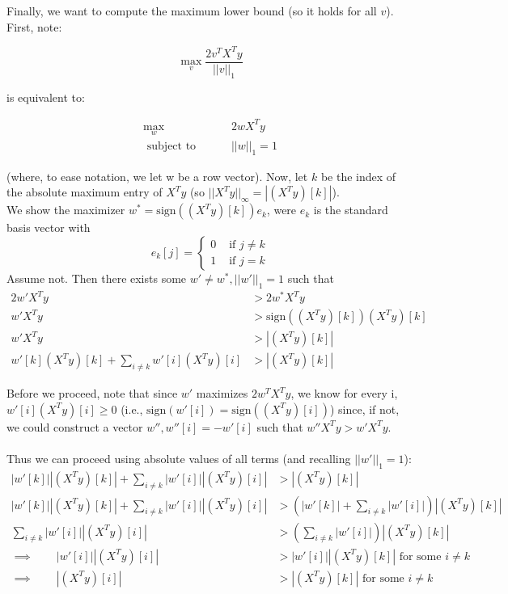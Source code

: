 \documentclass[paper=a4, fontsize=11pt]{scrartcl} %
\numberwithin{equation}{section} %
\numberwithin{figure}{section} %
\numberwithin{table}{section} %
\begin{document}
Finally, we want to compute the maximum lower bound (so it holds for all $v$). First, note:

\[\max_v \frac{2v^TX^Ty}{||v||_1}\]

is equivalent to:

\begin{align*}
\max_w \qquad{}& 2wX^Ty \\
\textrm{ subject to } \qquad{}&||w||_1 = 1
 \end{align*}

(where, to ease notation, we let w be a row vector). Now, let $k$ be the index of the absolute maximum entry of $X^Ty$ (so $||X^Ty||_\infty = |(X^Ty)[k]|$). \\

We show the maximizer $w^* = \textrm{sign}((X^Ty)[k])e_k$, were $e_k$ is the standard basis vector with 
\[
e_k[j] = 
\begin{cases}
0 & \textrm{ if } j \ne k \\
1 & \textrm{ if } j = k
\end{cases}
\]
Assume not. Then there exists some $w' \ne w^*, ||w'||_1 = 1$ such that
\begin{align*}
2w'X^Ty &> 2w^*X^Ty \\
w'X^Ty &> \textrm{sign}((X^Ty)[k]) (X^Ty)[k] \\
w'X^Ty &> |(X^Ty)[k]|\\
w'[k] (X^Ty)[k] + \sum_{i \ne k} w'[i] (X^Ty)[i] &> |(X^Ty)[k]|
\end{align*}

Before we proceed, note that since $w'$ maximizes $2w^TX^Ty$, we know for every i, $w'[i] (X^Ty)[i] \geq 0$ (i.e., $\textrm{sign}(w'[i]) = \textrm{sign}((X^Ty)[i])$) since, if not, we could construct a vector $w'', w''[i] = -w'[i]$ such that $w''X^Ty > w' X^Ty$.\\
\\
Thus we can proceed using absolute values of all terms (and recalling $||w'||_1 = 1$):
\begin{align*}
|w'[k]| |(X^Ty)[k]| + \sum_{i \ne k} |w'[i]| |(X^Ty)[i]| &>|(X^Ty)[k]| \\
|w'[k]| |(X^Ty)[k]| + \sum_{i \ne k} |w'[i]| |(X^Ty)[i]| &> \left(|w'[k]| +\sum_{i \ne k}  |w'[i]|\right) |(X^Ty)[k]| \\
\sum_{i \ne k} |w'[i]| |(X^Ty)[i]| &> \left(\sum_{i \ne k} |w'[i]|\right)|(X^Ty)[k]| \\
\implies \qquad{} |w'[i]| |(X^Ty)[i]| &> |w'[i]| |(X^Ty)[k]| \textrm{ for some } i \ne k\\
\implies \qquad{} |(X^Ty)[i]| &> |(X^Ty)[k]| \textrm{ for some } i \ne k\\
\end{align*}
\end{document}
